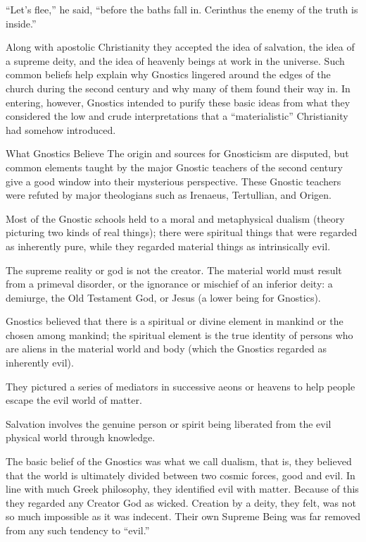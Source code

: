 “Let’s flee,” he said, “before the baths fall in. Cerinthus the enemy of the truth is inside.”

Along with apostolic Christianity they accepted the idea of salvation, the idea of a supreme deity,
and the idea of heavenly beings at work in the universe. Such common beliefs help explain why
Gnostics lingered around the edges of the church during the second century and why many of them
found their way in. In entering, however, Gnostics intended to purify these basic ideas from what
they considered the low and crude interpretations that a “materialistic” Christianity had somehow
introduced.

\begin{sidebar}{What Gnostics Believe}
The origin and sources for Gnosticism are disputed, but common elements taught by the major Gnostic
teachers of the second century give a good window into their mysterious perspective. These Gnostic
teachers were refuted by major theologians such as Irenaeus, Tertullian, and Origen.


\begin{numlist}
\item[1.] Most of the Gnostic schools held to a moral and metaphysical dualism (theory picturing two
  kinds of real things); there were spiritual things that were regarded as inherently pure, while
  they regarded material things as intrinsically evil.
\item[2.] The supreme reality or god is not the creator. The material world must result from a
  primeval disorder, or the ignorance or mischief of an inferior deity: a demiurge, the Old
  Testament God, or Jesus (a lower being for Gnostics).
\item[3.] Gnostics believed that there is a spiritual or divine element in mankind or the chosen
  among mankind; the spiritual element is the true identity of persons who are aliens in the
  material world and body (which the Gnostics regarded as inherently evil).
\item[4.] They pictured a series of mediators in successive aeons or heavens to help people escape
  the evil world of matter.
\item[5.] Salvation involves the genuine person or spirit being liberated from the evil physical
  world through knowledge.
\end{numlist}
\end{sidebar}

The basic belief of the Gnostics was what we call dualism, that is, they believed that the world is
ultimately divided between two cosmic forces, good and evil. In line with much Greek philosophy,
they identified evil with matter. Because of this they regarded any Creator God as wicked. Creation
by a deity, they felt, was not so much impossible as it was indecent. Their own Supreme Being was
far removed from any such tendency to “evil.”

